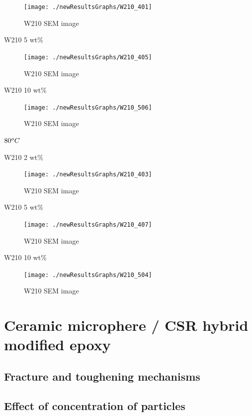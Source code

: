 \documentclass[numbers=noendperiod,chapterprefix=on]{icldt} %
\begin{document}
{\begin{figure}[!hp]
\centering
\texttt{[image: ./newResultsGraphs/W210\_401]}
\caption{W210 SEM image} \label{W210_401}
\end{figure}
\FloatBarrier

W210 5 wt\%

\begin{figure}[!hp]
\centering
\texttt{[image: ./newResultsGraphs/W210\_405]}
\caption{W210 SEM image} \label{W210_405}
\end{figure}
\FloatBarrier

W210 10 wt\%

\begin{figure}[!hp]
\centering
\texttt{[image: ./newResultsGraphs/W210\_506]}
\caption{W210 SEM image} \label{W210_506}
\end{figure}
\FloatBarrier

$\-80 ^oC$

W210 2 wt\%

\begin{figure}[!hp]
\centering
\texttt{[image: ./newResultsGraphs/W210\_403]}
\caption{W210 SEM image} \label{W210_403}
\end{figure}
\FloatBarrier

W210 5 wt\%

\begin{figure}[!hp]
\centering
\texttt{[image: ./newResultsGraphs/W210\_407]}
\caption{W210 SEM image} \label{W210_407}
\end{figure}
\FloatBarrier

W210 10 wt\%

\begin{figure}[!hp]
\centering
\texttt{[image: ./newResultsGraphs/W210\_504]}
\caption{W210 SEM image} \label{W210_504}
\end{figure}
\FloatBarrier


\section{Ceramic microphere / CSR hybrid modified epoxy} \label{Hybrid_W210_SEM}

\subsection{Fracture and toughening mechanisms}

\subsection{Effect of concentration of particles}

}
\end{document}
